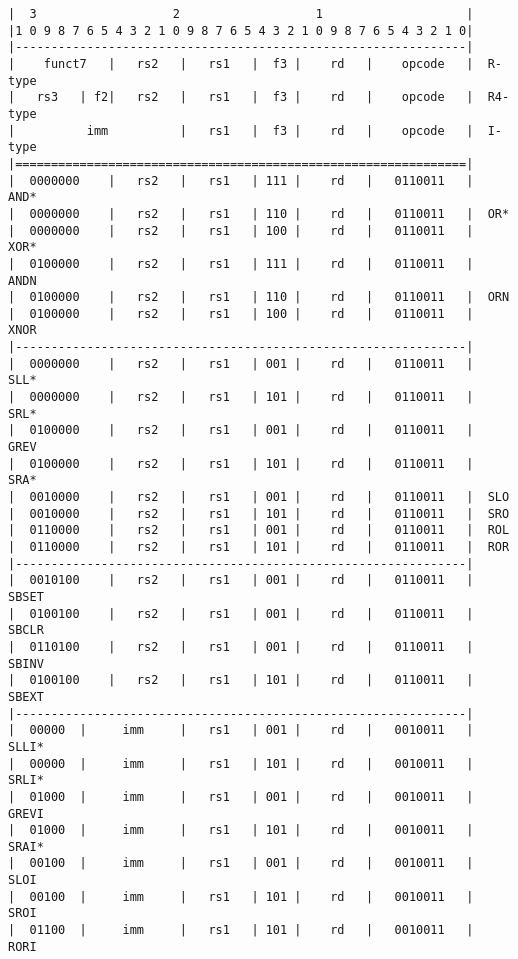 \begin{minipage}{\linewidth}
\begin{verbatim}
|  3                   2                   1                    |
|1 0 9 8 7 6 5 4 3 2 1 0 9 8 7 6 5 4 3 2 1 0 9 8 7 6 5 4 3 2 1 0|
|---------------------------------------------------------------|
|    funct7   |   rs2   |   rs1   |  f3 |    rd   |    opcode   |  R-type
|   rs3   | f2|   rs2   |   rs1   |  f3 |    rd   |    opcode   |  R4-type
|          imm          |   rs1   |  f3 |    rd   |    opcode   |  I-type
|===============================================================|
|  0000000    |   rs2   |   rs1   | 111 |    rd   |   0110011   |  AND*
|  0000000    |   rs2   |   rs1   | 110 |    rd   |   0110011   |  OR*
|  0000000    |   rs2   |   rs1   | 100 |    rd   |   0110011   |  XOR*
|  0100000    |   rs2   |   rs1   | 111 |    rd   |   0110011   |  ANDN
|  0100000    |   rs2   |   rs1   | 110 |    rd   |   0110011   |  ORN
|  0100000    |   rs2   |   rs1   | 100 |    rd   |   0110011   |  XNOR
|---------------------------------------------------------------|
|  0000000    |   rs2   |   rs1   | 001 |    rd   |   0110011   |  SLL*
|  0000000    |   rs2   |   rs1   | 101 |    rd   |   0110011   |  SRL*
|  0100000    |   rs2   |   rs1   | 001 |    rd   |   0110011   |  GREV
|  0100000    |   rs2   |   rs1   | 101 |    rd   |   0110011   |  SRA*
|  0010000    |   rs2   |   rs1   | 001 |    rd   |   0110011   |  SLO
|  0010000    |   rs2   |   rs1   | 101 |    rd   |   0110011   |  SRO
|  0110000    |   rs2   |   rs1   | 001 |    rd   |   0110011   |  ROL
|  0110000    |   rs2   |   rs1   | 101 |    rd   |   0110011   |  ROR
|---------------------------------------------------------------|
|  0010100    |   rs2   |   rs1   | 001 |    rd   |   0110011   |  SBSET
|  0100100    |   rs2   |   rs1   | 001 |    rd   |   0110011   |  SBCLR
|  0110100    |   rs2   |   rs1   | 001 |    rd   |   0110011   |  SBINV
|  0100100    |   rs2   |   rs1   | 101 |    rd   |   0110011   |  SBEXT
|---------------------------------------------------------------|
|  00000  |     imm     |   rs1   | 001 |    rd   |   0010011   |  SLLI*
|  00000  |     imm     |   rs1   | 101 |    rd   |   0010011   |  SRLI*
|  01000  |     imm     |   rs1   | 001 |    rd   |   0010011   |  GREVI
|  01000  |     imm     |   rs1   | 101 |    rd   |   0010011   |  SRAI*
|  00100  |     imm     |   rs1   | 001 |    rd   |   0010011   |  SLOI
|  00100  |     imm     |   rs1   | 101 |    rd   |   0010011   |  SROI
|  01100  |     imm     |   rs1   | 101 |    rd   |   0010011   |  RORI

\end{verbatim}
\end{minipage}
